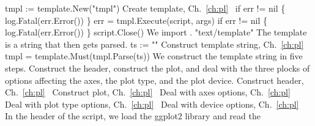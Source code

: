 tmpl := template.New("tmpl")
\LA{}Create template, Ch.~\ref{ch:pl}~{\nwtagstyle{}}\RA{}
if err != nil \{
          log.Fatal(err.Error())
\}
err = tmpl.Execute(script, args)
if err != nil \{
          log.Fatal(err.Error())
\}
script.Close()
\nwendcode{}\nwdocspar
We import .
\nwenddocs{}\plusendmoddef\nwstartdeflinemarkup{}\nwenddeflinemarkup
"text/template"
\nwendcode{}\nwdocspar
The template is a string that then gets parsed.
\nwenddocs{}\endmoddef\nwstartdeflinemarkup{}\nwenddeflinemarkup
ts := ""
\LA{}Construct template string, Ch.~\ref{ch:pl}~{\nwtagstyle{}}\RA{}
tmpl = template.Must(tmpl.Parse(ts))
\nwendcode{}\nwdocspar
We construct the template string in five steps. Construct the header,
construct the plot, and deal with the three plocks of options
affecting the axes, the plot type, and the plot device.
\nwenddocs{}\endmoddef\nwstartdeflinemarkup{}\nwenddeflinemarkup
\LA{}Construct header, Ch.~\ref{ch:pl}~{\nwtagstyle{}}\RA{}
\LA{}Construct plot, Ch.~\ref{ch:pl}~{\nwtagstyle{}}\RA{}
\LA{}Deal with axes options, Ch.~\ref{ch:pl}~{\nwtagstyle{}}\RA{}
\LA{}Deal with plot type options, Ch.~\ref{ch:pl}~{\nwtagstyle{}}\RA{}
\LA{}Deal with device options, Ch.~\ref{ch:pl}~{\nwtagstyle{}}\RA{}
\nwendcode{}\nwdocspar
In the header of the script, we load the ggplot2 library and read the
